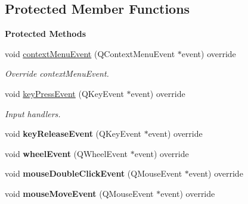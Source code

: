 \subsection*{Protected Member Functions}
\begin{Indent}\textbf{ Protected Methods}\par
\begin{DoxyCompactItemize}
\item 
\mbox{\label{classrev_1_1_view_1_1_g_l_widget_ae73b60c6086ec85b0284fa317e5e7a97}} 
void \mbox{\hyperlink{classrev_1_1_view_1_1_g_l_widget_ae73b60c6086ec85b0284fa317e5e7a97}{context\+Menu\+Event}} (Q\+Context\+Menu\+Event $\ast$event) override
\begin{DoxyCompactList}\small\item\em Override context\+Menu\+Event. \end{DoxyCompactList}\item 
\mbox{\label{classrev_1_1_view_1_1_g_l_widget_a9a83b84eea47fe31ce42fe838b8e1292}} 
void \mbox{\hyperlink{classrev_1_1_view_1_1_g_l_widget_a9a83b84eea47fe31ce42fe838b8e1292}{key\+Press\+Event}} (Q\+Key\+Event $\ast$event) override
\begin{DoxyCompactList}\small\item\em Input handlers. \end{DoxyCompactList}\item 
\mbox{\label{classrev_1_1_view_1_1_g_l_widget_a35d8bb4c469a7c0409e966e9832b751a}} 
void {\bfseries key\+Release\+Event} (Q\+Key\+Event $\ast$event) override
\item 
\mbox{\label{classrev_1_1_view_1_1_g_l_widget_a408eed5dd859ee363d47daad5b79fa78}} 
void {\bfseries wheel\+Event} (Q\+Wheel\+Event $\ast$event) override
\item 
\mbox{\label{classrev_1_1_view_1_1_g_l_widget_aec6d2806894a5089469eec8aca1e8ea7}} 
void {\bfseries mouse\+Double\+Click\+Event} (Q\+Mouse\+Event $\ast$event) override
\item 
\mbox{\label{classrev_1_1_view_1_1_g_l_widget_a8a29e3021aad930a3b7bbf4596d8eb61}} 
void {\bfseries mouse\+Move\+Event} (Q\+Mouse\+Event $\ast$event) override

\end{DoxyCompactItemize}
\end{Indent}

